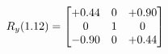 \documentclass[preview]{standalone}
\begin{document}
\begin{align*}
\special{dvisvgm:raw <g id='unique000'>}R_{y}(1.12) = \begin{bmatrix}+0.44 & 0 & +0.90 \\0 & 1 & 0 \\-0.90 & 0 & +0.44\end{bmatrix}\special{dvisvgm:raw </g>}
\end{align*}
\end{document}
